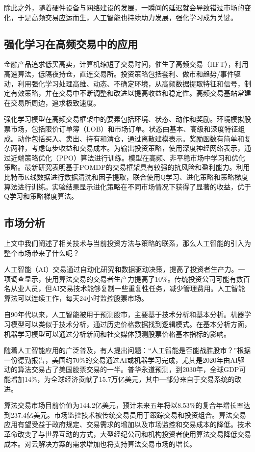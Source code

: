 除此之外，随着硬件设备与网络建设的发展，一瞬间的延迟就会导致错过市场的变化，于是高频交易应运而生，人工智能也持续助力发展，强化学习成为关键。

\subsection{强化学习在高频交易中的应用}
金融产品追求低买高卖，计算机缩短了交易时间，催生了高频交易（HFT），利用高速算法，低隔夜持仓，直连交易所。投资策略包括套利、做市和趋势/事件驱动，利用强化学习处理高维、动态、不确定环境，从高频数据提取特征和信号，制定有效策略，并在交易中不断调整和改进以提高收益和稳定性。高频交易基站常建在交易所周边，追求极致速度。

强化学习模型在高频交易框架中的要素包括环境、状态、动作和奖励。环境模拟股票市场，包括限价订单簿（LOB）和市场订单。状态由基本、高级和深度特征组成。动作包括买入、卖出、持有和清仓，通过离散建模表示。奖励函数有简单和复杂两种，考虑每步收益和交易成本。为输出投资策略，使用深度神经网络表示，通过近端策略优化（PPO）算法进行训练。模型在高频、非平稳市场中学习和优化策略。最新研究表明基于POMDP的交易框架具有较强的抗风险和盈利能力。利用比特币K线数据进行数据清洗和因子提取，联合使用Q学习、进化策略和策略梯度算法进行训练。实验结果显示进化策略在不同市场情况下获得了显著的收益，优于Q学习和策略梯度算法。

\subsection{市场分析}
上文中我们阐述了相关技术与当前投资方法与策略的联系，那么人工智能的引入为整个市场带来了什么呢？

人工智能（AI）交易通过自动化研究和数据驱动决策，提高了投资者生产力。一项调查显示，使用算法交易的交易者生产力提高了10\%。传统投资公司可能有数百名从业人员，但AI交易技术能够复制一些重复性任务，减少管理费用。人工智能算法可以连续工作，每天24小时监控股票市场。

自90年代以来，人工智能被用于预测股市，主要基于技术分析和基本分析。机器学习模型可以类似于技术分析，通过历史价格数据找到逻辑模式。在基本分析方面，机器学习模型可以通过分析新闻和社交媒体预测股票价格基本指标的影响。

随着人工智能应用的广泛普及，有人提出问题：“人工智能是否能战胜股市？”根据一份德勤报告，美国约70\%的交易通过AI或机器学习完成，尤其是2020年由AI驱动的算法交易占了美国股票交易的一半。普华永道预测，到2030年，全球GDP可能增加14\%，为全球经济贡献了15.7万亿美元，其中一部分来自于交易系统的改进。

算法交易市场目前价值为144.2亿美元，预计未来五年将以8.53\%的复合年增长率达到237.4亿美元。市场监控技术被传统交易员用于跟踪交易和投资组合。算法交易应用有望受益于政府规定、交易需求的增加以及市场监控和交易成本的降低。技术革命改变了与世界互动的方式，大型经纪公司和机构投资者使用算法交易降低交易成本。对云解决方案的需求增加也将支持算法交易市场的增长。

